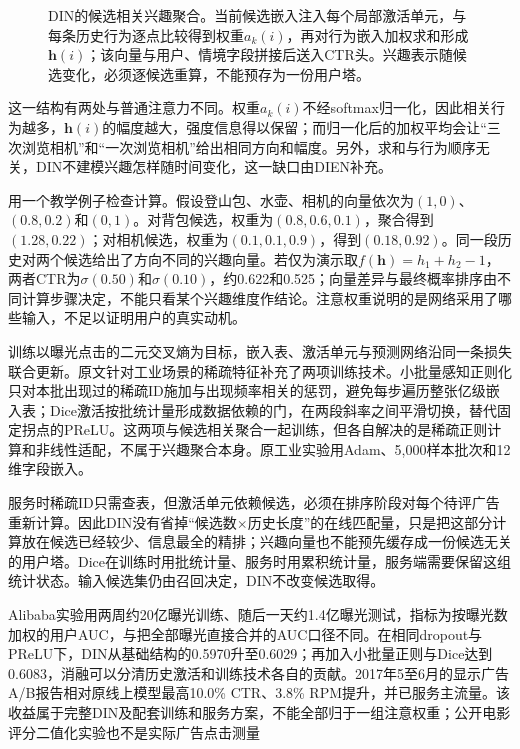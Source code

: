 \begin{figure}[htbp]
  \centering
  
  \caption{DIN的候选相关兴趣聚合。当前候选嵌入注入每个局部激活单元，与每条历史行为逐点比较得到权重$a_k(i)$，再对行为嵌入加权求和形成$\bm h(i)$；该向量与用户、情境字段拼接后送入CTR头。兴趣表示随候选变化，必须逐候选重算，不能预存为一份用户塔。}
  \label{fig:rs-din-activation}
\end{figure}

这一结构有两处与普通注意力不同。权重$a_k(i)$不经softmax归一化，因此相关行为越多，$\bm{h}(i)$的幅度越大，强度信息得以保留；而归一化后的加权平均会让“三次浏览相机”和“一次浏览相机”给出相同方向和幅度。另外，求和与行为顺序无关，DIN不建模兴趣怎样随时间变化，这一缺口由DIEN补充。

用一个教学例子检查计算。假设登山包、水壶、相机的向量依次为$(1,0)$、$(0.8,0.2)$和$(0,1)$。对背包候选，权重为$(0.8,0.6,0.1)$，聚合得到$(1.28,0.22)$；对相机候选，权重为$(0.1,0.1,0.9)$，得到$(0.18,0.92)$。同一段历史对两个候选给出了方向不同的兴趣向量。若仅为演示取$f(\bm{h})=h_1+h_2-1$，两者CTR为$\sigma(0.50)$和$\sigma(0.10)$，约0.622和0.525；向量差异与最终概率排序由不同计算步骤决定，不能只看某个兴趣维度作结论。注意权重说明的是网络采用了哪些输入，不足以证明用户的真实动机。

训练以曝光点击的二元交叉熵为目标，嵌入表、激活单元与预测网络沿同一条损失联合更新。原文针对工业场景的稀疏特征补充了两项训练技术。小批量感知正则化只对本批出现过的稀疏ID施加与出现频率相关的惩罚，避免每步遍历整张亿级嵌入表；Dice激活按批统计量形成数据依赖的门，在两段斜率之间平滑切换，替代固定拐点的PReLU。这两项与候选相关聚合一起训练，但各自解决的是稀疏正则计算和非线性适配，不属于兴趣聚合本身。原工业实验用Adam、5,000样本批次和12维字段嵌入。

服务时稀疏ID只需查表，但激活单元依赖候选，必须在排序阶段对每个待评广告重新计算。因此DIN没有省掉“候选数$\times$历史长度”的在线匹配量，只是把这部分计算放在候选已经较少、信息最全的精排；兴趣向量也不能预先缓存成一份候选无关的用户塔。Dice在训练时用批统计量、服务时用累积统计量，服务端需要保留这组统计状态。输入候选集仍由召回决定，DIN不改变候选取得。

Alibaba实验用两周约20亿曝光训练、随后一天约1.4亿曝光测试，指标为按曝光数加权的用户AUC，与把全部曝光直接合并的AUC口径不同。在相同dropout与PReLU下，DIN从基础结构的0.5970升至0.6029；再加入小批量正则与Dice达到0.6083，消融可以分清历史激活和训练技术各自的贡献。2017年5至6月的显示广告A/B报告相对原线上模型最高10.0\% CTR、3.8\% RPM提升，并已服务主流量。该收益属于完整DIN及配套训练和服务方案，不能全部归于一组注意权重；公开电影评分二值化实验也不是实际广告点击测量

